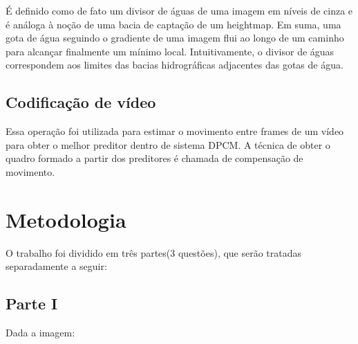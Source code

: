 \documentclass[journal]{IEEEtran}
\begin{document}
É definido como de fato um divisor de águas de uma imagem em níveis de cinza e é análoga à noção de uma bacia de captação de um heightmap. Em suma, uma gota de água seguindo o gradiente de uma imagem flui ao longo de um caminho para alcançar finalmente um mínimo local. Intuitivamente, o divisor de águas correspondem aos limites das bacias hidrográficas adjacentes das gotas de água.

\subsection{Codificação de vídeo}
Essa operação foi utilizada para estimar o movimento entre frames de um vídeo para obter o melhor preditor dentro de sistema DPCM. A técnica de obter o quadro formado a partir dos preditores é chamada de compensação de movimento.

\section{Metodologia}
O trabalho foi dividido em três partes(3 questões), que serão tratadas separadamente a seguir:\newline

\subsection*{Parte I}
Dada a imagem:
\end{document}
